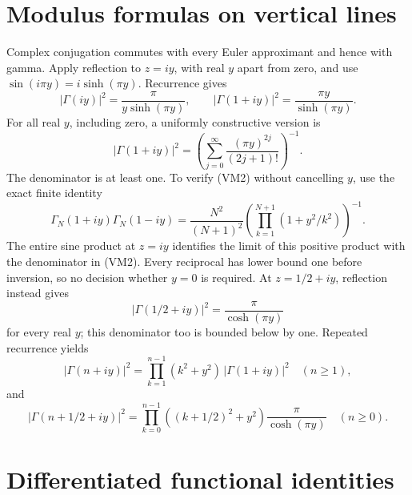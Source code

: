 \section{Modulus formulas on vertical lines}

Complex conjugation commutes with every Euler approximant and hence
with gamma. Apply reflection to \(z=iy\), with real \(y\) apart from
zero, and use \(\sin(i\pi y)=i\sinh(\pi y)\). Recurrence gives
\[
 |\Gamma(iy)|^2=\frac\pi{y\sinh(\pi y)},\qquad
 |\Gamma(1+iy)|^2=\frac{\pi y}{\sinh(\pi y)}.           \tag{VM1}
\]
For all real \(y\), including zero, a uniformly constructive version is
\[
 |\Gamma(1+iy)|^2
  =\left(\sum_{j=0}^{\infty}
                \frac{(\pi y)^{2j}}{(2j+1)!}\right)^{-1}.             \tag{VM2}
\]
The denominator is at least one. To verify (VM2) without cancelling
\(y\), use the exact finite identity
\[
 \Gamma_N(1+iy)\Gamma_N(1-iy)
   =\frac{N^2}{(N+1)^2}
     \left(\prod_{k=1}^{N+1}(1+y^2/k^2)\right)^{-1}.
\]
The entire sine product at \(z=iy\) identifies the limit of this
positive product with the denominator in (VM2). Every reciprocal has
lower bound one before inversion, so no decision whether \(y=0\) is
required.
At \(z=1/2+iy\), reflection instead gives
\[
 |\Gamma(1/2+iy)|^2=\frac\pi{\cosh(\pi y)}              \tag{VM3}
\]
for every real \(y\); this denominator too is bounded below by one.
Repeated recurrence yields
\[
 |\Gamma(n+iy)|^2
  =\prod_{k=1}^{n-1}(k^2+y^2)\,|\Gamma(1+iy)|^2
       \quad(n\ge1),                                  \tag{VM4}
\]
and
\[
 |\Gamma(n+1/2+iy)|^2
  =\prod_{k=0}^{n-1}((k+1/2)^2+y^2)
                   \frac\pi{\cosh(\pi y)}\quad(n\ge0). \tag{VM5}
\]

\section{Differentiated functional identities}

